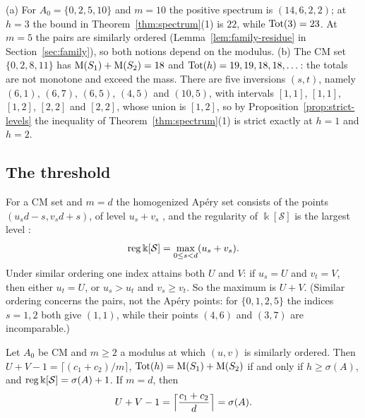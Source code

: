 \begin{example}\label{ex:spectrum}
(a) For $A_0=\{0,2,5,10\}$ and $m=10$ the positive spectrum is $(14,6,2,2)$; at $h=3$ the bound in Theorem~\ref{thm:spectrum}(1) is $22$, while $\operatorname{Tot}(3)=23$. At $m=5$ the pairs are similarly ordered (Lemma~\ref{lem:family-residue} in Section~\ref{sec:family}), so both notions depend on the modulus. (b) The CM set $\{0,2,8,11\}$ has $\operatorname{M}(S_1)+\operatorname{M}(S_2)=18$ and $\operatorname{Tot}(h)=19,19,18,18,\dots$: the totals are not monotone and exceed the mass. There are five inversions $(s,t)$, namely $(6,1)$, $(6,7)$, $(6,5)$, $(4,5)$ and $(10,5)$, with intervals $[1,1]$, $[1,1]$, $[1,2]$, $[2,2]$ and $[2,2]$, whose union is $[1,2]$, so by Proposition~\ref{prop:strict-levels} the inequality of Theorem~\ref{thm:spectrum}(1) is strict exactly at $h=1$ and $h=2$.
\end{example}

\subsection{The threshold}\label{subsec:threshold}

For a CM set and $m=d$ the homogenized Ap\'ery set consists of the points $(u_sd-s,v_sd+s)$, of level $u_s+v_s$ \cite[Prop.~2.6(3)]{GimenezGonzalezSanchez2023}, and the regularity of $\Bbbk[\mathcal S]$ is the largest level \cite[Thm.~3.7]{GimenezGonzalezSanchez2023}:
\begin{equation}\label{eq:reg-cm}
\operatorname{reg} \Bbbk[\mathcal S]=\max_{0\le s<d}(u_s+v_s).
\end{equation}
Under similar ordering one index attains both $U$ and $V$: if $u_s=U$ and $v_t=V$, then either $u_t=U$, or $u_s>u_t$ and $v_s\ge v_t$. So the maximum is $U+V$. (Similar ordering concerns the pairs, not the Ap\'ery points: for $\{0,1,2,5\}$ the indices $s=1,2$ both give $(1,1)$, while their points $(4,6)$ and $(3,7)$ are incomparable.)

\begin{proposition}[Threshold]\label{prop:threshold}
Let $A_0$ be CM and $m\ge2$ a modulus at which $(u,v)$ is similarly ordered. Then $U+V-1=\lceil(c_1+c_2)/m\rceil$, $\operatorname{Tot}(h)=\operatorname{M}(S_1)+\operatorname{M}(S_2)$ if and only if $h\ge\sigma(A)$, and $\operatorname{reg} \Bbbk[\mathcal S]=\sigma(A)+1$. If $m=d$, then
\[
U+V-1=\Bigl\lceil\frac{c_1+c_2}{d}\Bigr\rceil=\sigma(A).
\]
\end{proposition}

